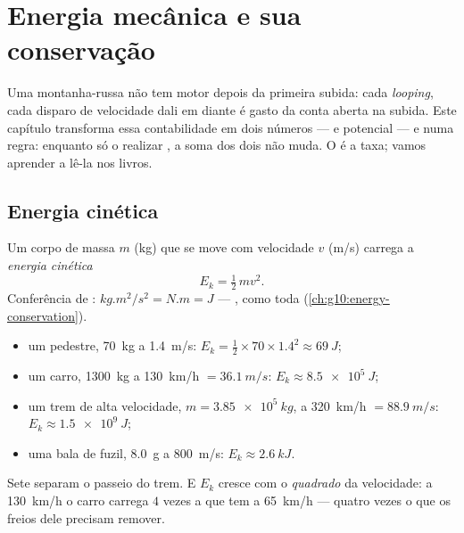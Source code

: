 \chapter{Energia mecânica e sua conservação}\label{ch:g11:mechanical-energy}

Uma montanha-russa não tem motor depois da primeira subida: cada
\emph{looping}, cada disparo de velocidade dali em diante é gasto da
conta aberta na subida. Este capítulo transforma essa contabilidade em
dois números ---  e  potencial --- e numa regra:
enquanto só o  realizar , a soma dos dois não muda. O 
é a taxa; vamos aprender a lê-la nos livros.

\section{Energia cinética}

\begin{definition}\label{def:g11:mechanical-energy:kinetic}
Um corpo de massa $m$ (\unit{kg}) que se move com velocidade $v$
(\unit{m/s}) carrega a \emph{energia cinética}
\[
E_k = \tfrac12\, m v^2 .
\]
Conferência de : $\unit{kg.m^2/s^2} = \unit{N.m} = \unit{J}$ ---
, como toda  (\cref{ch:g10:energy-conservation}).
\end{definition}

\begin{example}\label{ex:g11:mechanical-energy:orders}
\begin{itemize}
  \item um pedestre, \qty{70}{kg} a \qty{1.4}{m/s}:
        $E_k = \tfrac12 \times 70 \times 1.4^2 \approx \qty{69}{J}$;
  \item um carro, \qty{1300}{kg} a \qty{130}{km/h} $= \qty{36.1}{m/s}$:
        $E_k \approx \qty{8.5e5}{J}$;
  \item um trem de alta velocidade, $m = \qty{3.85e5}{kg}$, a
        \qty{320}{km/h} $= \qty{88.9}{m/s}$: $E_k \approx \qty{1.5e9}{J}$;
  \item uma bala de fuzil, \qty{8.0}{g} a \qty{800}{m/s}:
        $E_k \approx \qty{2.6}{kJ}$.
\end{itemize}
Sete  separam o passeio do trem. E $E_k$ cresce com o
\emph{quadrado} da velocidade: a \qty{130}{km/h} o carro carrega $4$
vezes a  que tem a \qty{65}{km/h} --- quatro vezes o que os freios
dele precisam remover.
\end{example}

